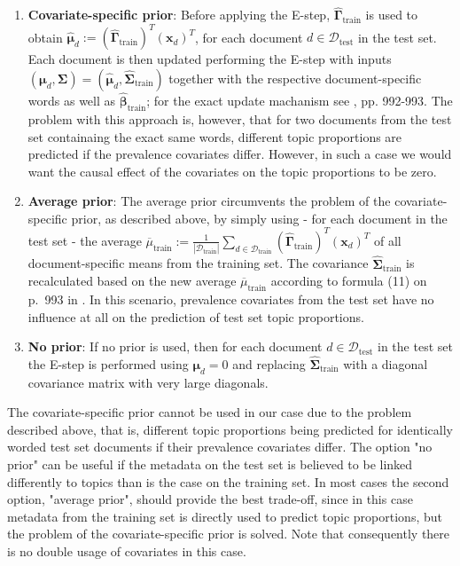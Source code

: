 \begin{enumerate}
\item \textbf{Covariate-specific prior}: Before applying the E-step, $\hat{\boldsymbol{\Gamma}}_{\text{train}}$ is used to obtain $\hat{\boldsymbol{\mu}}_d := (\hat{\boldsymbol{\Gamma}}_{\text{train}})^T(\boldsymbol{x}_d)^T$, for each document $d \in \mathcal{D}_{\text{test}}$ in the test set. Each document is then updated performing the E-step with inputs $(\boldsymbol{\mu}_d, \boldsymbol{\Sigma}) = (\hat{\boldsymbol{\mu}}_d, \hat{\boldsymbol{\Sigma}}_{\text{train}})$ together with the respective document-specific words as well as $\hat{\boldsymbol{\beta}}_{\text{train}}$; for the exact update machanism see \cite{roberts2013structural}, pp. 992-993. The problem with this approach is, however, that for two documents from the test set containaing the exact same words, different topic proportions are predicted if the prevalence covariates differ. However, in such a case we would want the causal effect of the covariates on the topic proportions to be zero.
\item \textbf{Average prior}: The average prior circumvents the problem of the covariate-specific prior, as described above, by simply using - for each document in the test set - the average $\overline{\mu}_{\text{train}} := \frac{1}{|\mathcal{D}_{\text{train}}|}\sum_{d \in \mathcal{D}_{\text{train}}} (\hat{\boldsymbol{\Gamma}}_{\text{train}})^T(\boldsymbol{x}_d)^T$ of all document-specific means from the training set. The covariance $\hat{\boldsymbol{\Sigma}}_{\text{train}}$ is recalculated based on the new average $\overline{\mu}_{\text{train}}$ according to formula (11) on p.\ 993 in \cite{roberts2013structural}. In this scenario, prevalence covariates from the test set have no influence at all on the prediction of test set topic proportions. 
\item \textbf{No prior}: If no prior is used, then for each document $d \in \mathcal{D}_{\text{test}}$ in the test set the E-step is performed using $\boldsymbol{\mu}_d=0$ and replacing $\hat{\boldsymbol{\Sigma}}_{\text{train}}$ with a diagonal covariance matrix with very large diagonals.
\end{enumerate}
The covariate-specific prior cannot be used in our case due to the problem described above, that is, different topic proportions being predicted for identically worded test set documents if their prevalence covariates differ. The option "no prior" can be useful if the metadata on the test set is believed to be linked differently to topics than is the case on the training set. In most cases the second option, "average prior", should provide the best trade-off, since in this case metadata from the training set is directly used to predict topic proportions, but the problem of the covariate-specific prior is solved. Note that consequently there is no double usage of covariates in this case.

